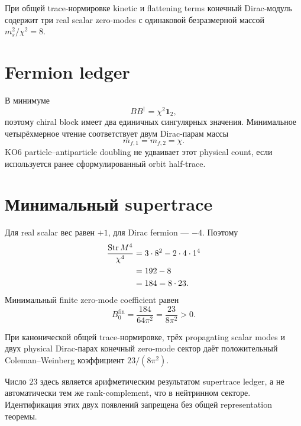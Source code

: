 \begin{proposition}
При общей trace-нормировке kinetic и flattening terms конечный
Dirac-модуль содержит три real scalar zero-modes с одинаковой
безразмерной массой \(m_s^2/\chi^2=8\).
\end{proposition}

\section{Fermion ledger}

В минимуме
\begin{equation}
 B B^\dagger=\chi^2\mathbf1_2,
\end{equation}
поэтому chiral block имеет два единичных сингулярных значения. Минимальное
четырёхмерное чтение соответствует двум Dirac-парам массы
\begin{equation}
 m_{f,1}=m_{f,2}=\chi.
\end{equation}
KO6 particle--antiparticle doubling не удваивает этот physical count, если
используется ранее сформулированный orbit half-trace.

\section{Минимальный supertrace}

Для real scalar вес равен \(+1\), для Dirac fermion --- \(-4\). Поэтому
\begin{align}
 \frac{\operatorname{Str} M^4}{\chi^4}
 &=3\cdot8^2-2\cdot4\cdot1^4\\
 &=192-8\\
 &=184=8\cdot23.
\end{align}
Минимальный finite zero-mode coefficient равен
\begin{equation}
 \boxed{
 B_0^{\mathrm{fin}}
 =\frac{184}{64\pi^2}
 =\frac{23}{8\pi^2}>0.}
\end{equation}

\begin{theorem}
При канонической общей trace-нормировке, трёх propagating scalar modes и
двух physical Dirac-парах конечный zero-mode сектор даёт положительный
Coleman--Weinberg коэффициент \(23/(8\pi^2)\).
\end{theorem}

Число \(23\) здесь является арифметическим результатом supertrace ledger,
а не автоматически тем же rank-complement, что в нейтринном секторе.
Идентификация этих двух появлений запрещена без общей representation
теоремы.


